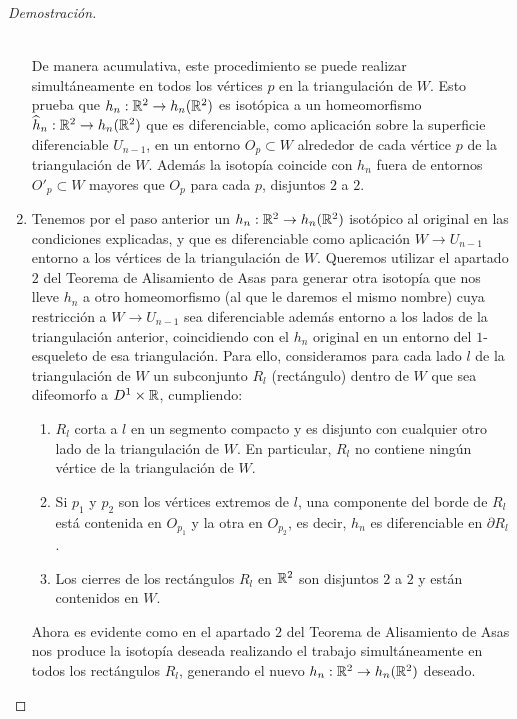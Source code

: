 \begin{proof}[Demostración]
\begin{enumerate}
			\\ De manera acumulativa, este procedimiento se puede realizar simultáneamente en todos los vértices $p$ en la triangulación de $W$. Esto prueba que $h_n: \mathbb{R}^2 \rightarrow h_n(\mathbb{R}^2)$ es isotópica a un homeomorfismo $\widehat{h}_n: \mathbb{R}^2 \rightarrow h_n(\mathbb{R}^2)$ que es diferenciable, como aplicación sobre la superficie diferenciable $U_{n-1}$, en un entorno $O_p \subset W$ alrededor de cada vértice $p$ de la triangulación de $W$. Además la isotopía coincide con $h_n$ fuera de entornos $O'_p \subset W$ mayores que $O_p$ para cada $p$, disjuntos $2$ a $2$.\\

			\item Tenemos por el paso anterior un $h_n: \mathbb{R}^2 \rightarrow h_n(\mathbb{R}^2)$ isotópico al original en las condiciones explicadas, y que es diferenciable como aplicación $W \rightarrow U_{n-1}$ entorno a los vértices de la triangulación de $W$. Queremos utilizar el apartado $2$ del Teorema de Alisamiento de Asas para generar otra isotopía que nos lleve $h_n$ a otro homeomorfismo (al que le daremos el mismo nombre) cuya restricción a $W \rightarrow U_{n-1}$ sea diferenciable además entorno a los lados de la triangulación anterior, coincidiendo con el $h_n$ original en un entorno del $1$-esqueleto de esa triangulación. Para ello, consideramos para cada lado $l$ de la triangulación de $W$ un subconjunto $R_l$ (rectángulo) dentro de $W$ que sea difeomorfo a $D^1 \times \mathbb{R}$, cumpliendo:
				\begin{enumerate}
					\item $R_l$ corta a $l$ en un segmento compacto y es disjunto con cualquier otro lado de la triangulación de $W$. En particular, $R_l$ no contiene ningún vértice de la triangulación de $W$.
					\item Si $p_1$ y $p_2$ son los vértices extremos de $l$, una componente del borde de $R_l$ está contenida en $O_{p_1}$ y la otra en $O_{p_2}$, es decir, $h_n$ es diferenciable en $\partial R_l$.
					\item Los cierres de los rectángulos $R_l$ en $\mathbb{R}^2$ son disjuntos $2$ a $2$ y están contenidos en $W$.
				\end{enumerate}

			Ahora es evidente como en el apartado $2$ del Teorema de Alisamiento de Asas nos produce la isotopía deseada realizando el trabajo simultáneamente en todos los rectángulos $R_l$, generando el nuevo $h_n:\mathbb{R}^2 \rightarrow h_n(\mathbb{R}^2)$ deseado.\\


\end{enumerate}
\end{proof}
